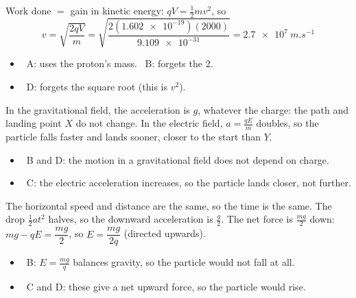 \documentclass[12pt]{article}
\begin{document}
\begin{practiceanswers}
\begin{practiceans}
  Work done $=$ gain in kinetic energy: $qV = \frac{1}{2}mv^2$, so
  \[ v = \sqrt{\frac{2qV}{m}} = \sqrt{\frac{2(\num{1.602e-19})(2000)}{\num{9.109e-31}}} = \qty{2.7e7}{m.s^{-1}} \]
  \begin{itemize}
    \item \xmark\ A: uses the proton's mass. \quad \xmark\ B: forgets the 2.
    \item \xmark\ D: forgets the square root (this is $v^2$).
  \end{itemize}
\end{practiceans}

\begin{practiceans}
  In the gravitational field, the acceleration is $g$, whatever the charge: the path and landing point
  $X$ do not change. In the electric field, $a = \frac{qE}{m}$ doubles, so the particle falls faster and
  lands sooner, closer to the start than $Y$.
  \begin{itemize}
    \item \xmark\ B and D: the motion in a gravitational field does not depend on charge.
    \item \xmark\ C: the electric acceleration increases, so the particle lands closer, not further.
  \end{itemize}
\end{practiceans}

\begin{practiceans}
  The horizontal speed and distance are the same, so the time is the same. The drop $\frac{1}{2}at^2$
  halves, so the downward acceleration is $\frac{g}{2}$. The net force is $\frac{mg}{2}$ down:
  $mg - qE = \dfrac{mg}{2}$, so $E = \dfrac{mg}{2q}$ (directed upwards).
  \begin{itemize}
    \item \xmark\ B: $E = \frac{mg}{q}$ balances gravity, so the particle would not fall at all.
    \item \xmark\ C and D: these give a net upward force, so the particle would rise.
  \end{itemize}
\end{practiceans}


\end{practiceanswers}
\end{document}
